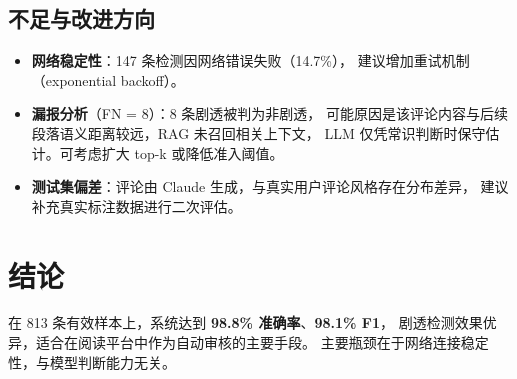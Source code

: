 \documentclass[12pt, a4paper]{article}
\begin{document}
\subsection{不足与改进方向}

\begin{itemize}
  \item \textbf{网络稳定性}：147 条检测因网络错误失败（14.7\%），
        建议增加重试机制（exponential backoff）。
  \item \textbf{漏报分析}（FN = 8）：8 条剧透被判为非剧透，
        可能原因是该评论内容与后续段落语义距离较远，RAG 未召回相关上下文，
        LLM 仅凭常识判断时保守估计。可考虑扩大 top-k 或降低准入阈值。
  \item \textbf{测试集偏差}：评论由 Claude 生成，与真实用户评论风格存在分布差异，
        建议补充真实标注数据进行二次评估。
\end{itemize}

\section{结论}

在 813 条有效样本上，系统达到 \textbf{98.8\% 准确率}、\textbf{98.1\% F1}，
剧透检测效果优异，适合在阅读平台中作为自动审核的主要手段。
主要瓶颈在于网络连接稳定性，与模型判断能力无关。
\end{document}
